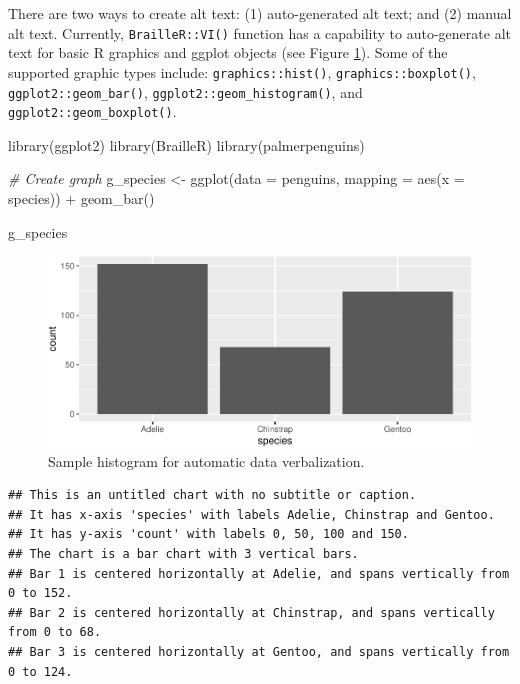 \documentclass[12pt]{article}
\newenvironment{Shaded}{\begin{snugshade}}{\end{snugshade}}
\newcommand{\AttributeTok}[1]{\textcolor[rgb]{0.77,0.63,0.00}{#1}}
\newcommand{\CommentTok}[1]{\textcolor[rgb]{0.56,0.35,0.01}{\textit{#1}}}
\newcommand{\FunctionTok}[1]{\textcolor[rgb]{0.00,0.00,0.00}{#1}}
\newcommand{\NormalTok}[1]{#1}
\newcommand{\OtherTok}[1]{\textcolor[rgb]{0.56,0.35,0.01}{#1}}
\newcommand{\SpecialCharTok}[1]{\textcolor[rgb]{0.00,0.00,0.00}{#1}}
\begin{document}
There are two ways to create alt text: (1) auto-generated alt text; and (2) manual alt text. Currently, \texttt{BrailleR::VI()} \citep{R-BrailleR} function has a capability to auto-generate alt text for basic R graphics and ggplot objects (see Figure \ref{fig:VI-example}).
Some of the supported graphic types include: \texttt{graphics::hist()}, \texttt{graphics::boxplot()}, \texttt{ggplot2::geom\_bar()}, \texttt{ggplot2::geom\_histogram()}, and \texttt{ggplot2::geom\_boxplot()}.

\begin{Shaded}
\begin{Highlighting}[]
\FunctionTok{library}\NormalTok{(ggplot2)}
\FunctionTok{library}\NormalTok{(BrailleR)}
\FunctionTok{library}\NormalTok{(palmerpenguins)}

\CommentTok{\# Create graph}
\NormalTok{g\_species }\OtherTok{\textless{}{-}} \FunctionTok{ggplot}\NormalTok{(}\AttributeTok{data =}\NormalTok{ penguins, }\AttributeTok{mapping =} \FunctionTok{aes}\NormalTok{(}\AttributeTok{x =}\NormalTok{ species)) }\SpecialCharTok{+}
  \FunctionTok{geom\_bar}\NormalTok{()}

\NormalTok{g\_species}
\end{Highlighting}
\end{Shaded}

\begin{figure}
\includegraphics{figure/VI-example-1} \caption{Sample histogram for automatic data verbalization.}\label{fig:VI-example}
\end{figure}

\begin{verbatim}
## This is an untitled chart with no subtitle or caption.
## It has x-axis 'species' with labels Adelie, Chinstrap and Gentoo.
## It has y-axis 'count' with labels 0, 50, 100 and 150.
## The chart is a bar chart with 3 vertical bars.
## Bar 1 is centered horizontally at Adelie, and spans vertically from 0 to 152.
## Bar 2 is centered horizontally at Chinstrap, and spans vertically from 0 to 68.
## Bar 3 is centered horizontally at Gentoo, and spans vertically from 0 to 124.
\end{verbatim}
\end{document}
